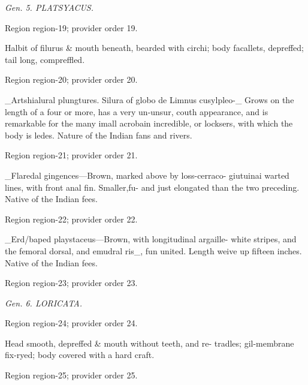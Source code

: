 \documentclass[11pt]{article}
\begin{document}
{\small\itshape Gen. 5. PLATSYACUS.\par}

{\scriptsize\color{gray} Region region-19; provider order 19.\par}
\medskip

Halbit of filurus \& mouth beneath, bearded with circhi;
body facallets, depreffed; tail long, compreffled.
\par

{\scriptsize\color{gray} Region region-20; provider order 20.\par}
\medskip

\_Artshialural plungtures. Silura of globo de Limnus cusylpleo-\_
Grows on the length of a four or more, has a very un-unsur,
couth appearance, and is remarkable for the many imall
acrobain incredible, or locksers, with which the body
is ledes. Nature of the Indian fans and rivers.
\par

{\scriptsize\color{gray} Region region-21; provider order 21.\par}
\medskip

\_Flaredal gingences—Brown, marked above by loss-cerraco-
giutuinai warted lines, with front anal fin. Smaller,fu-
and just elongated than the two preceding. Native of
the Indian fees.
\par

{\scriptsize\color{gray} Region region-22; provider order 22.\par}
\medskip

\_Erd/baped playstaceus—Brown, with longitudinal argaille-
white stripes, and the femoral dorsal, and emudral ris\_,
fun united. Length weive up fifteen inches. Native
of the Indian fees.
\par

{\scriptsize\color{gray} Region region-23; provider order 23.\par}
\medskip

{\small\itshape Gen. 6. LORICATA.\par}

{\scriptsize\color{gray} Region region-24; provider order 24.\par}
\medskip

Head smooth, depreffed \& mouth without teeth, and re-
tradles; gil-membrane fix-ryed; body covered with
a hard craft.
\par

{\scriptsize\color{gray} Region region-25; provider order 25.\par}
\medskip
\end{document}
